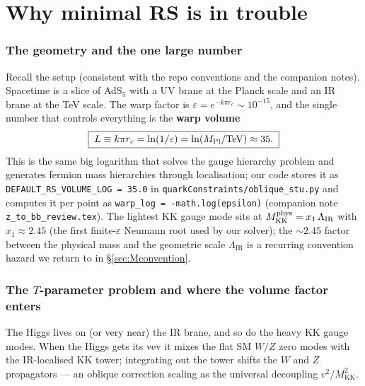 \documentclass[11pt]{article}
\newcommand{\MKK}{M_{\mathrm{KK}}}
\newcommand{\LIR}{\Lambda_{\mathrm{IR}}}
\newcommand{\vev}{v}
\newcommand{\eps}{\varepsilon}
\newcommand{\code}[1]{\texttt{#1}}
\theoremstyle{definition}
\begin{document}
\part{Why minimal RS is in trouble}
\label{part:rs}

\section{The geometry and the one large number}
\label{sec:geom}

Recall the setup (consistent with the repo conventions and the companion notes).
Spacetime is a slice of AdS$_5$ with a UV brane at the Planck scale and an IR
brane at the TeV scale. The warp factor is $\eps = e^{-k\pi r_c}\sim 10^{-15}$,
and the single number that controls everything is the \textbf{warp volume}
\begin{equation}
\boxed{\;L \equiv k\pi r_c = \ln(1/\eps) = \ln(M_{\rm Pl}/{\rm TeV}) \approx 35.\;}
\label{eq:L}
\end{equation}
This is the same big logarithm that solves the gauge hierarchy problem and
generates fermion mass hierarchies through localisation; our code stores it as
\code{DEFAULT\_RS\_VOLUME\_LOG = 35.0} in
\code{quarkConstraints/oblique\_stu.py} and computes it per point as
\code{warp\_log = -math.log(epsilon)} (companion note
\code{z\_to\_bb\_review.tex}). The lightest KK gauge mode sits at
$\MKK^{\rm phys} = x_1\,\LIR$ with $x_1\approx 2.45$ (the first finite-$\eps$
Neumann root used by our solver); the $\sim 2.45$ factor between the physical
mass and the geometric scale $\LIR$ is a recurring convention hazard we return to
in \S\ref{sec:Mconvention}.

\section{The $T$-parameter problem and where the volume factor enters}
\label{sec:Tprob}

The Higgs lives on (or very near) the IR brane, and so do the heavy KK gauge
modes. When the Higgs gets its vev it mixes the flat SM $W/Z$ zero modes with the
IR-localised KK tower; integrating out the tower shifts the $W$ and $Z$
propagators --- an oblique correction scaling as the universal decoupling
$\vev^2/\MKK^2$.
\end{document}
